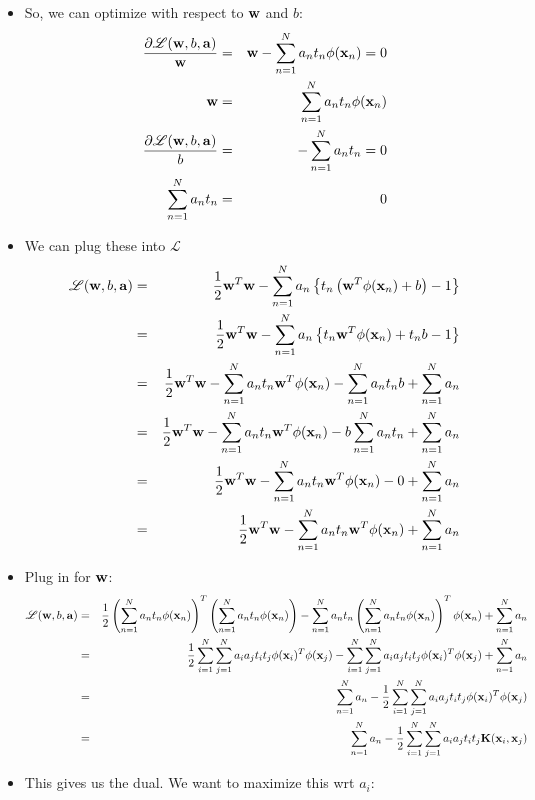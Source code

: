 \documentclass[12pt,letterpaper]{article}
\begin{document}
\begin{itemize}
\item So, we can optimize with respect to $\mathbf{w}$ and $b$:
\begin{eqnarray}
\frac{\partial \mathscr{L}(\mathbf{w},b,\mathbf{a})}{\mathbf{w}} &=& \mathbf{w} - \sum_{n=1}^N a_n t_n \phi(\mathbf{x}_n) = 0\\
\mathbf{w} &=& \sum_{n=1}^N a_n t_n \phi(\mathbf{x}_n)\\
\frac{\partial \mathscr{L}(\mathbf{w},b,\mathbf{a})}{b} &=& - \sum_{n=1}^N a_n t_n  = 0\\
 \sum_{n=1}^N a_n t_n  &=& 0
\end{eqnarray}
\item We can plug these into $\mathscr{L}$
\begin{eqnarray}
\mathscr{L}(\mathbf{w}, b, \mathbf{a}) &=& \frac{1}{2}\mathbf{w}^T\mathbf{w} - \sum_{n=1}^N a_n \left\{  t_n \left(\mathbf{w}^T\phi(\mathbf{x}_n) + b \right)  - 1 \right\}\\
&=& \frac{1}{2}\mathbf{w}^T\mathbf{w} - \sum_{n=1}^N a_n \left\{  t_n \mathbf{w}^T\phi(\mathbf{x}_n) + t_n b   - 1 \right\}\\
&=& \frac{1}{2}\mathbf{w}^T\mathbf{w} - \sum_{n=1}^N a_n t_n \mathbf{w}^T\phi(\mathbf{x}_n) - \sum_{n=1}^N a_n t_n b   + \sum_{n=1}^N a_n \\
&=& \frac{1}{2}\mathbf{w}^T\mathbf{w} - \sum_{n=1}^N a_n t_n \mathbf{w}^T\phi(\mathbf{x}_n) - b \sum_{n=1}^N a_n t_n    + \sum_{n=1}^N a_n \\
&=& \frac{1}{2}\mathbf{w}^T\mathbf{w} - \sum_{n=1}^N a_n t_n \mathbf{w}^T\phi(\mathbf{x}_n) - 0    + \sum_{n=1}^N a_n \\
&=& \frac{1}{2}\mathbf{w}^T\mathbf{w} - \sum_{n=1}^N a_n t_n \mathbf{w}^T\phi(\mathbf{x}_n) + \sum_{n=1}^N a_n \\
\end{eqnarray}
\item Plug in for $\mathbf{w}$:
\begin{eqnarray}
\mathscr{L}(\mathbf{w}, b, \mathbf{a}) &=&  \frac{1}{2}\left(\sum_{n=1}^N a_n t_n \phi(\mathbf{x}_n) \right)^T\left(\sum_{n=1}^N a_n t_n \phi(\mathbf{x}_n) \right)- \sum_{n=1}^N a_n t_n \left(\sum_{n=1}^N a_n t_n \phi(\mathbf{x}_n) \right)^T\phi(\mathbf{x}_n) + \sum_{n=1}^N a_n \nonumber \\
&=& \frac{1}{2} \sum_{i=1}^N\sum_{j=1}^N a_i a_j t_i t_j \phi(\mathbf{x}_i)^T\phi(\mathbf{x}_j) - \sum_{i=1}^N\sum_{j=1}^N a_i a_j t_i t_j \phi(\mathbf{x}_i)^T\phi(\mathbf{x}_j) + \sum_{n=1}^N a_n \nonumber \\
&=& \sum_{n=1}^N a_n - \frac{1}{2} \sum_{i=1}^N\sum_{j=1}^N a_i a_j t_i t_j \phi(\mathbf{x}_i)^T\phi(\mathbf{x}_j) \nonumber\\
&=& \sum_{n=1}^N a_n - \frac{1}{2} \sum_{i=1}^N\sum_{j=1}^N a_i a_j t_i t_j \mathbf{K}(\mathbf{x}_i,\mathbf{x}_j) \nonumber
\end{eqnarray}
\item This gives us the dual.  We want to maximize this wrt $a_i$:

\end{itemize}
\end{document}
